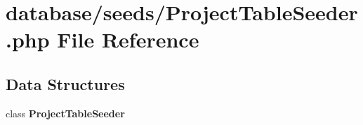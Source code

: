 \section{database/seeds/\+Project\+Table\+Seeder.php File Reference}
\label{_project_table_seeder_8php}
\subsection*{Data Structures}
\begin{DoxyCompactItemize}
\item 
class {\bf Project\+Table\+Seeder}
\end{DoxyCompactItemize}
